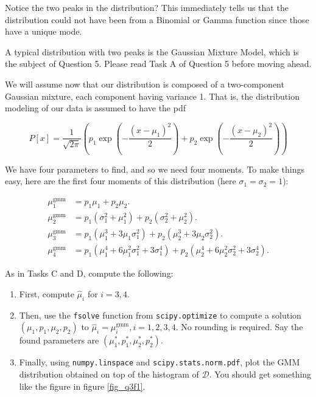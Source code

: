 \begin{tcolorbox}
    Notice the two peaks in the distribution? This immediately tells us that the
    distribution could not have been from a Binomial or Gamma function since those
    have a unique mode.
    
    A typical distribution with two peaks is the Gaussian Mixture Model, which is
    the subject of Question 5. Please read Task A of Question 5 before moving
    ahead.
    
    We will assume now that our distribution is composed of a two-component
    Gaussian mixture, each component having variance 1. That is, the distribution
    modeling of our data is assumed to have the pdf

    \begin{equation*}
        P[x] = \dfrac{1}{\sqrt{2\pi}}\left(
        p_1 \exp{\left(-\dfrac{(x - \mu_1)^2}{2}\right)} +
        p_2 \exp{\left(-\dfrac{(x - \mu_2)^2}{2}\right)}
        \right)
    \end{equation*}

    We have four parameters to find, and so we need four moments. To make things
    easy, here are the first four moments of this distribution (here $\sigma_1 =
    \sigma_2 = 1$):

    \begin{equation*}
        \begin{aligned}
            \mu_1^{\text{gmm}} &= p_1 \mu_1 + p_2 \mu_2. \\
            \mu_2^{\text{gmm}} &= p_1 (\sigma_1^2 + \mu_1^2) + p_2 (\sigma_2^2 +
            \mu_2^2).\\
            \mu_3^{\text{gmm}} &= p_1 (\mu_1^3 + 3 \mu_1 \sigma_1^2) + p_2
            (\mu_2^3 + 3 \mu_2 \sigma_2^2).\\
            \mu_4^{\text{gmm}} &= p_1 (\mu_1^4 + 6 \mu_1^2 \sigma_1^2 + 3
            \sigma_1^4) + p_2 (\mu_2^4 + 6 \mu_2^2 \sigma_2^2 + 3 \sigma_2^4).
        \end{aligned}
    \end{equation*}

    As in Tasks C and D, compute the following:

    \vspace{10pt}
    \begin{enumerate}
        \item First, compute $\hat{\mu}_i$ for  $i = 3, 4$.
        \item Then, use the \texttt{fsolve} function from \texttt{scipy.optimize}
        to compute a solution $(\mu_1, p_1, \mu_2, p_2)$ to $\hat{\mu}_i =
        \mu^{\text{gmm}}_i, i = 1, 2, 3, 4$. No rounding is required. Say the
        found parameters are $(\mu_1^*, p_1^*, \mu_2^*, p_2^*)$.
        \item Finally, using \texttt{numpy.linspace} and
        \texttt{scipy.stats.norm.pdf}, plot the GMM distribution obtained on top
        of the histogram of $\mathcal{D}$. You should get something like the
        figure in figure \ref{fig_q3f1}.
    \end{enumerate}


\end{tcolorbox}
